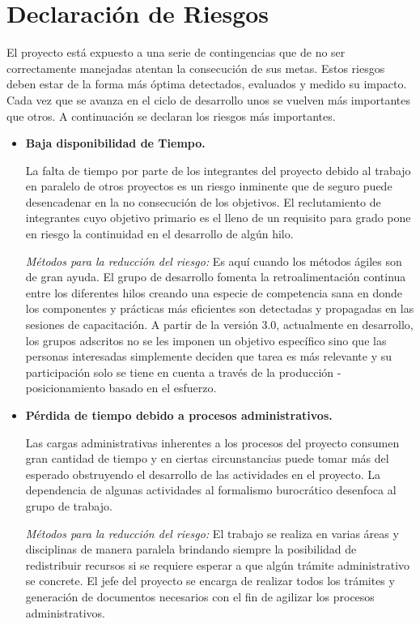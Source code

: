 \chapter{Declaración de Riesgos}
\label{anexo_riesgos}
El proyecto está expuesto a una serie de contingencias que de no ser correctamente manejadas atentan la consecución de sus metas. Estos riesgos deben estar de la forma más óptima detectados, evaluados y medido su impacto. Cada vez que se avanza en el ciclo de desarrollo unos se vuelven más importantes que otros. A continuación se declaran los riesgos más importantes.

\begin{itemize}
\item \textbf{Baja disponibilidad de Tiempo.} 

La falta de tiempo por parte de los integrantes del proyecto debido al trabajo en paralelo de otros proyectos es un riesgo inminente que de seguro puede desencadenar en la no consecución de los objetivos. El reclutamiento de integrantes cuyo objetivo primario es el lleno de un requisito para grado pone en riesgo la continuidad en el desarrollo de algún hilo.

\textit{Métodos para la reducción del riesgo:} Es aquí cuando los métodos ágiles son de gran ayuda. El grupo de desarrollo fomenta la retroalimentación continua entre los diferentes hilos creando una especie de competencia sana en donde los componentes y prácticas más eficientes son detectadas y propagadas en las sesiones de capacitación. A partir de la versión 3.0, actualmente en desarrollo, los grupos adscritos no se les imponen un objetivo específico sino que las personas interesadas simplemente deciden que tarea es más relevante y su participación solo se tiene en cuenta a través de la producción - posicionamiento basado en el esfuerzo. 


\item \textbf{Pérdida de tiempo debido a procesos administrativos.} 

Las cargas administrativas inherentes a los procesos del proyecto consumen gran cantidad de tiempo y en ciertas circunstancias puede tomar más del esperado obstruyendo el desarrollo de las actividades en el proyecto. La dependencia de algunas actividades al formalismo burocrático desenfoca al grupo de trabajo.

\textit{Métodos para la reducción del riesgo:}  El trabajo se realiza en varias áreas y disciplinas de manera paralela brindando siempre la posibilidad de redistribuir recursos si se requiere esperar a que algún trámite administrativo se concrete.  El jefe del proyecto se encarga de realizar todos los trámites y generación de documentos necesarios con el fin de agilizar los procesos administrativos. 



\end{itemize}
